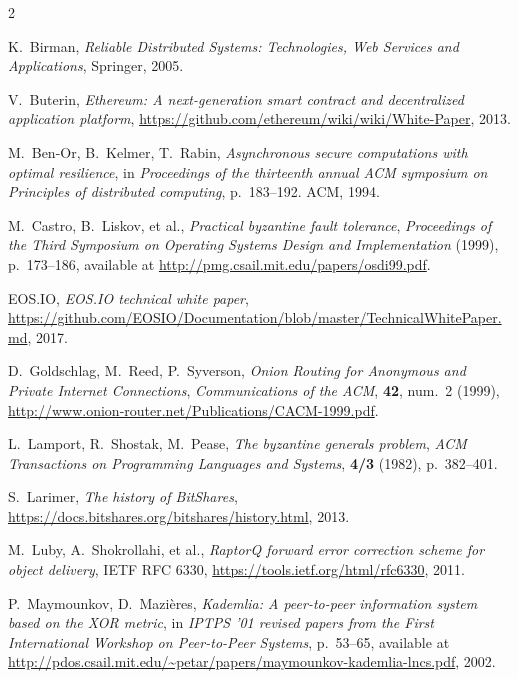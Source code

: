 \documentclass[12pt,oneside]{article}
\begin{document}
\begin{thebibliography}{2}

  {\sc K.~Birman}, {\sl Reliable Distributed Systems: Technologies, Web Services and Applications}, Springer, 2005.

  {\sc V.~Buterin}, {\sl Ethereum: A next-generation smart contract and decentralized application platform}, \url{https://github.com/ethereum/wiki/wiki/White-Paper}, 2013.

  {\sc M.~Ben-Or, B.~Kelmer, T.~Rabin}, {\sl Asynchronous secure computations with optimal resilience}, in {\em Proceedings of the thirteenth annual ACM symposium on Principles of distributed computing}, p.~183--192. ACM, 1994.

  {\sc M.~Castro, B.~Liskov, et al.}, {\sl Practical byzantine fault tolerance}, {\it Proceedings of the Third Symposium on Operating Systems Design and Implementation\/} (1999), p.~173--186, available at \url{http://pmg.csail.mit.edu/papers/osdi99.pdf}.

  {\sc EOS.IO}, {\sl EOS.IO technical white paper}, \url{https://github.com/EOSIO/Documentation/blob/master/TechnicalWhitePaper.md}, 2017.

  {\sc D.~Goldschlag, M.~Reed, P.~Syverson}, {\sl Onion Routing for Anonymous and Private Internet Connections}, {\it Communications of the ACM}, {\bf 42}, num.~2 (1999), \url{http://www.onion-router.net/Publications/CACM-1999.pdf}.

  {\sc L.~Lamport, R.~Shostak, M.~Pease}, {\sl The byzantine generals problem}, {\it ACM Transactions on Programming Languages and Systems}, {\bf 4/3} (1982), p.~382--401.

  {\sc S.~Larimer}, {\sl The history of BitShares}, \url{https://docs.bitshares.org/bitshares/history.html}, 2013.

  {\sc M.~Luby, A.~Shokrollahi, et al.}, {\sl RaptorQ forward error correction scheme for object delivery}, IETF RFC 6330, \url{https://tools.ietf.org/html/rfc6330}, 2011.

  {\sc P.~Maymounkov, D.~Mazi\`eres}, {\sl Kademlia: A peer-to-peer information system based on the XOR metric}, in {\em IPTPS '01 revised papers from the First International Workshop on Peer-to-Peer Systems}, p.~53--65, available at \url{http://pdos.csail.mit.edu/~petar/papers/maymounkov-kademlia-lncs.pdf}, 2002.


\end{thebibliography}
\end{document}
